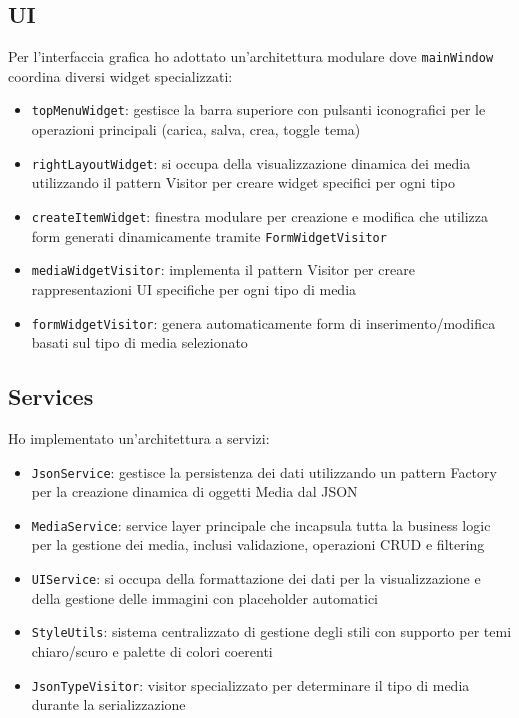 \documentclass[a4paper,10pt]{article}
\begin{document}
\newpage

\subsection{UI}
Per l'interfaccia grafica ho adottato un'architettura modulare dove \texttt{mainWindow} coordina diversi widget specializzati:

\begin{itemize}
    \item \texttt{topMenuWidget}: gestisce la barra superiore con pulsanti iconografici per le operazioni principali (carica, salva, crea, toggle tema)
    \item \texttt{rightLayoutWidget}: si occupa della visualizzazione dinamica dei media utilizzando il pattern Visitor per creare widget specifici per ogni tipo
    \item \texttt{createItemWidget}: finestra modulare per creazione e modifica che utilizza form generati dinamicamente tramite \texttt{FormWidgetVisitor}
    \item \texttt{mediaWidgetVisitor}: implementa il pattern Visitor per creare rappresentazioni UI specifiche per ogni tipo di media
    \item \texttt{formWidgetVisitor}: genera automaticamente form di inserimento/modifica basati sul tipo di media selezionato
\end{itemize}

\subsection{Services}
Ho implementato un'architettura a servizi:

\begin{itemize}
    \item \texttt{JsonService}: gestisce la persistenza dei dati utilizzando un pattern Factory per la creazione dinamica di oggetti Media dal JSON
    \item \texttt{MediaService}: service layer principale che incapsula tutta la business logic per la gestione dei media, inclusi validazione, operazioni CRUD e filtering
    \item \texttt{UIService}: si occupa della formattazione dei dati per la visualizzazione e della gestione delle immagini con placeholder automatici
    \item \texttt{StyleUtils}: sistema centralizzato di gestione degli stili con supporto per temi chiaro/scuro e palette di colori coerenti
    \item \texttt{JsonTypeVisitor}: visitor specializzato per determinare il tipo di media durante la serializzazione
\end{itemize}
\end{document}

